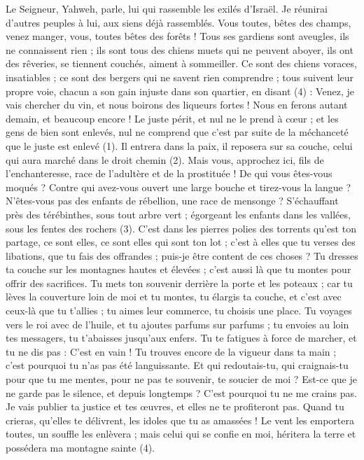 \begin{multicols}{2}
{Le Seigneur, Yahweh, parle, lui qui rassemble les exilés d'Israël. Je réunirai d’autres peuples à lui, aux siens déjà rassemblés.
Vous toutes, bêtes des champs, venez manger, vous, toutes bêtes des forêts !
Tous ses gardiens sont aveugles, ils ne connaissent rien ; ils sont tous des chiens muets qui ne peuvent aboyer, ils ont des rêveries, se tiennent couchés, aiment à sommeiller.
Ce sont des chiens voraces, insatiables ; ce sont des bergers qui ne savent rien comprendre ; tous suivent leur propre voie, chacun a son gain injuste dans son quartier, en disant (4) :
Venez, je vais chercher du vin, et nous boirons des liqueurs fortes ! Nous en ferons autant demain, et beaucoup encore !
\VerseOne{}Le juste périt, et nul ne le prend à cœur ; et les gens de bien sont enlevés, nul ne comprend que c’est par suite de la méchanceté que le juste est enlevé (1).
Il entrera dans la paix, il reposera sur sa couche, celui qui aura marché dans le droit chemin (2).
Mais vous, approchez ici, fils de l’enchanteresse, race de l’adultère et de la prostituée !
De qui vous êtes-vous moqués ? Contre qui avez-vous ouvert une large bouche et tirez-vous la langue ? N'êtes-vous pas des enfants de rébellion, une race de mensonge ?
S’échauffant près des térébinthes, sous tout arbre vert ; égorgeant les enfants dans les vallées, sous les fentes des rochers (3).
C’est dans les pierres polies des torrents qu’est ton partage, ce sont elles, ce sont elles qui sont ton lot ; c’est à elles que tu verses des libations, que tu fais des offrandes ; puis-je être content de ces choses ?
Tu dresses ta couche sur les montagnes hautes et élevées ; c’est aussi là que tu montes pour offrir des sacrifices.
Tu mets ton souvenir derrière la porte et les poteaux ; car tu lèves la couverture loin de moi et tu montes, tu élargis ta couche, et c’est avec ceux-là que tu t’allies ; tu aimes leur commerce, tu choisis une place.
Tu voyages vers le roi avec de l’huile, et tu ajoutes parfums sur parfums ; tu envoies au loin tes messagers, tu t’abaisses jusqu'aux enfers.
Tu te fatigues à force de marcher, et tu ne dis pas : C’est en vain ! Tu trouves encore de la vigueur dans ta main ; c’est pourquoi tu n'as pas été languissante.
Et qui redoutais-tu, qui craignais-tu pour que tu me mentes, pour ne pas te souvenir, te soucier de moi ? Est-ce que je ne garde pas le silence, et depuis longtemps ? C’est pourquoi tu ne me crains pas.
Je vais publier ta justice et tes œuvres, et elles ne te profiteront pas.
Quand tu crieras, qu’elles te délivrent, les idoles que tu as amassées ! Le vent les emportera toutes, un souffle les enlèvera ; mais celui qui se confie en moi, héritera la terre et possédera ma montagne sainte (4).
}
\end{multicols}
